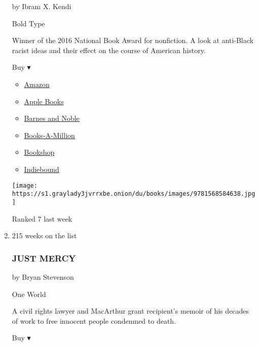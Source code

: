 \begin{enumerate}
  by Ibram X. Kendi

  Bold Type

  Winner of the 2016 National Book Award for nonfiction. A look at
  anti-Black racist ideas and their effect on the course of American
  history.

  Buy ▾

  \begin{itemize}
  \tightlist
  \item
    \href{https://www.amazon.com/Stamped-Beginning-Definitive-History-National/dp/1568584636?tag=NYTBS-20}{Amazon}
  \item
    \href{https://du-gae-books-dot-nyt-du-prd.appspot.com/buy?title=STAMPED+FROM+THE+BEGINNING\&author=Ibram+X+Kendi}{Apple
    Books}
  \item
    \href{https://www.anrdoezrs.net/click-7990613-11819508?url=https\%3A\%2F\%2Fwww.barnesandnoble.com\%2Fw\%2F\%3Fean\%3D9781568585987}{Barnes
    and Noble}
  \item
    \href{https://www.anrdoezrs.net/click-7990613-35140?url=https\%3A\%2F\%2Fwww.booksamillion.com\%2Fp\%2FSTAMPED\%2BFROM\%2BTHE\%2BBEGINNING\%2FIbram\%2BX\%2BKendi\%2F9781568585987}{Books-A-Million}
  \item
    \href{https://bookshop.org/a/3546/9781568585987}{Bookshop}
  \item
    \href{https://www.indiebound.org/book/9781568585987?aff=NYT}{Indiebound}
  \end{itemize}

  \texttt{[image: https://s1.graylady3jvrrxbe.onion/du/books/images/9781568584638.jpg]}

  Ranked 7 last week
\item
  215 weeks on the list

  \hypertarget{just-mercy}{%
  \subsubsection{JUST MERCY}\label{just-mercy}}

  by Bryan Stevenson

  One World

  A civil rights lawyer and MacArthur grant recipient's memoir of his
  decades of work to free innocent people condemned to death.

  Buy ▾


\end{enumerate}
